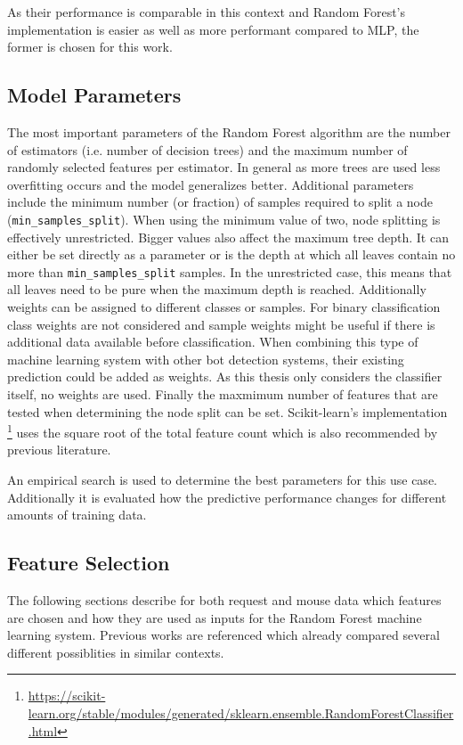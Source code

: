 \documentclass[
    fontsize=12pt,
    headings=small,
    parskip=half,           %
    bibliography=totoc,
    numbers=noenddot,       %
    open=any,               %
    final,                   %
    table
]{scrreprt}
\begin{document}
As their performance is comparable in this context and Random Forest's implementation is easier as well as more performant compared to MLP, the former is chosen for this work.

\subsection{Model Parameters}

The most important parameters of the Random Forest algorithm are the number of estimators (i.e. number of decision trees) and the maximum number of randomly selected features per estimator. In general as more trees are used less overfitting occurs and the model generalizes better. Additional parameters include the minimum number (or fraction) of samples required to split a node (\lstinline{min_samples_split}). When using the minimum value of two, node splitting is effectively unrestricted. Bigger values also affect the maximum tree depth. It can either be set directly as a parameter or is the depth at which all leaves contain no more than \lstinline{min_samples_split} samples. In the unrestricted case, this means that all leaves need to be pure when the maximum depth is reached. Additionally weights can be assigned to different classes or samples. For binary classification class weights are not considered and sample weights might be useful if there is additional data available before classification. When combining this type of machine learning system with other bot detection systems, their existing prediction could be added as weights. As this thesis only considers the classifier itself, no weights are used. Finally the maxmimum number of features that are tested when determining the node split can be set. Scikit-learn's implementation \footnote{\url{https://scikit-learn.org/stable/modules/generated/sklearn.ensemble.RandomForestClassifier.html}} uses the square root of the total feature count which is also recommended by previous literature. \cite{Hastie2009}

An empirical search is used to determine the best parameters for this use case. Additionally it is evaluated how the predictive performance changes for different amounts of training data.

\subsection{Feature Selection}

The following sections describe for both request and mouse data which features are chosen and how they are used as inputs for the Random Forest machine learning system. Previous works are referenced which already compared several different possiblities in similar contexts.
\end{document}
